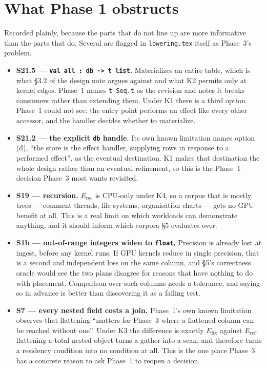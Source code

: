 \documentclass[11pt,a4paper]{article}
\begin{document}
\section{What Phase 1 obstructs}

Recorded plainly, because the parts that do not line up are more informative
than the parts that do. Several are flagged in \texttt{lowering.tex} itself as
Phase~3's problem.

\begin{itemize}
  \item \textbf{S21.5 --- \texttt{val all : db -> t list}.} Materializes an
        entire table, which is what §3.2 of the design note argues against and
        what K2 permits only at kernel edges. Phase~1 names \texttt{t Seq.t}
        as the revision and notes it breaks consumers rather than extending
        them. Under K1 there is a third option Phase~1 could not see: the
        entry point performs an effect like every other accessor, and the
        handler decides whether to materialize.
  \item \textbf{S21.2 --- the explicit \texttt{db} handle.} Its own known
        limitation names option (d), ``the store is the effect handler,
        supplying rows in response to a performed effect'', as the eventual
        destination. K1 makes that destination the whole design rather than an
        eventual refinement, so this is the Phase~1 decision Phase~3 most
        wants revisited.
  \item \textbf{S19 --- recursion.} $E_{\mathrm{rec}}$ is CPU-only under K4,
        so a corpus that is mostly trees --- comment threads, file systems,
        organisation charts --- gets no GPU benefit at all. This is a real
        limit on which workloads can demonstrate anything, and it should
        inform which corpora §5 evaluates over.
  \item \textbf{S1b --- out-of-range integers widen to \texttt{float}.}
        Precision is already lost at ingest, before any kernel runs. If GPU
        kernels reduce in single precision, that is a second and independent
        loss on the same column, and §5's correctness oracle would see the two
        plans disagree for reasons that have nothing to do with placement.
        Comparison over such columns needs a tolerance, and saying so in
        advance is better than discovering it as a failing test.
  \item \textbf{S7 --- every nested field costs a join.} Phase~1's own known
        limitation observes that flattening ``matters for Phase~3 where a
        flattened column can be reached without one''. Under K3 the difference
        is exactly $E_{\mathrm{fix}}$ against $E_{\mathrm{ref}}$: flattening a
        total nested object turns a gather into a scan, and therefore turns a
        residency condition into no condition at all. This is the one place
        Phase~3 has a concrete reason to ask Phase~1 to reopen a decision.
\end{itemize}
\end{document}
